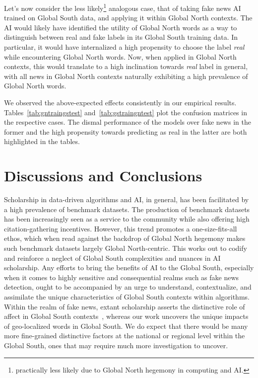 \documentclass[runningheads]{llncs}
\begin{document}

Let's now consider the less likely\footnote{practically less likely due to Global North hegemony in computing and AI.} analogous case, that of taking fake news AI trained on Global South data, and applying it within Global North contexts. The AI would likely have identified the utility of Global North words as a way to distinguish between real and fake labels in its Global South training data. In particular, it would have internalized a high propensity to choose the label {\it real} while encountering Global North words. Now, when applied in Global North contexts, this would translate to a high inclination towards {\it real} label in general, with all news in Global North contexts naturally exhibiting a high prevalence of Global North words. 

We observed the above-expected effects consistently in our empirical results. Tables~\ref{tab:gntraingstest} and~\ref{tab:gstraingntest} plot the confusion matrices in the respective cases. The dismal performance of the models over fake news in the former and the high propensity towards predicting as real in the latter are both highlighted in the tables. 

\section{Discussions and Conclusions}

 Scholarship in data-driven algorithms and AI, in general, has been facilitated by a high prevalence of benchmark datasets. The production of benchmark datasets has been increasingly seen as a service to the community while also offering high citation-gathering incentives. However, this trend promotes a one-size-fits-all ethos, which when read against the backdrop of Global North hegemony makes such benchmark datasets largely Global North-centric. This works out to codify and reinforce a neglect of Global South complexities and nuances in AI scholarship. Any efforts to bring the benefits of AI to the Global South, especially when it comes to highly sensitive and consequential realms such as fake news detection, ought to be accompanied by an urge to understand, contextualize, and assimilate the unique characteristics of Global South contexts within algorithms. Within the realm of fake news, extant scholarship asserts the distinctive role of affect in Global South contexts~\cite{deepak2024geo}, whereas our work uncovers the unique impacts of geo-localized words in Global South. We do expect that there would be many more fine-grained distinctive factors at the national or regional level within the Global South, ones that may require much more investigation to uncover. 
\end{document}
